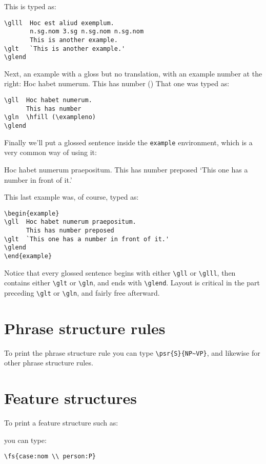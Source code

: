 \documentclass{article}
\begin{document}
\glend
This is typed as:
\begin{verbatim}
\glll  Hoc est aliud exemplum.
       n.sg.nom 3.sg n.sg.nom n.sg.nom
       This is another example.
\glt   `This is another example.'
\glend
\end{verbatim}
Next, an example with a gloss but no translation, with an example number 
at the right:
\gll  Hoc habet numerum.
      This has number
\gln  \hfill (\exampleno)
\glend
That one was typed as:
\begin{verbatim}
\gll  Hoc habet numerum.
      This has number
\gln  \hfill (\exampleno)
\glend
\end{verbatim}
Finally we'll put a glossed sentence inside the {\tt example} 
environment, which is a very common way of using it:
\begin{example}
\gll  Hoc habet numerum praepositum.
      This has number preposed
\glt  `This one has a number in front of it.'
\glend
\end{example}
This last example was, of course, typed as:
\begin{verbatim}
\begin{example}
\gll  Hoc habet numerum praepositum.
      This has number preposed
\glt  `This one has a number in front of it.'
\glend
\end{example}
\end{verbatim}
Notice that every glossed sentence begins with either \verb"\gll" or 
\verb"\glll", then contains either \verb"\glt" or \verb"\gln", and ends 
with \verb"\glend".  Layout is critical in the part preceding 
\verb"\glt" or \verb"\gln", and fairly free afterward.

\section{Phrase structure rules}

To print the phrase structure rule  you can type
\verb"\psr{S}{NP~VP}", and likewise for other phrase structure rules.

\section{Feature structures}

To print a feature structure such as:
\begin{flushleft}
\end{flushleft}
you can type:
\begin{verbatim}
\fs{case:nom \\ person:P}
\end{verbatim}
\end{document}
